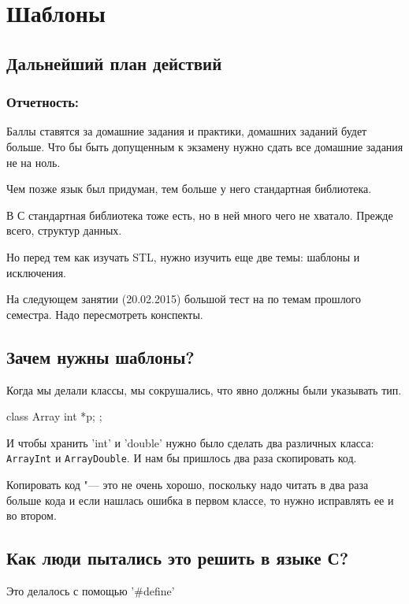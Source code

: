 \chapter{Шаблоны}

\section{Дальнейший план действий}

\subsection{Отчетность:}

Баллы ставятся за домашние задания и практики, домашних заданий будет больше.
Что бы быть допущенным к экзамену нужно сдать все домашние задания не на ноль. 

Чем позже язык был придуман, тем больше у него стандартная библиотека.

В С стандартная библиотека тоже есть, но в ней много чего не хватало.
Прежде всего, структур данных.

Но перед  тем как изучать STL, нужно изучить еще две темы: шаблоны и исключения. 

На следующем занятии (20.02.2015) большой тест на по темам прошлого семестра.
Надо пересмотреть конспекты.

\section{Зачем нужны шаблоны?}
Когда мы делали классы, мы сокрушались, что явно должны были указывать тип.

\begin{cppcode}
class Array{
     int *p;
};
\end{cppcode}

И чтобы хранить \cpp'int' и \cpp'double' нужно было сделать два различных класса: \verb'ArrayInt' и \verb'ArrayDouble'.
И нам бы пришлось два раза скопировать код.

Копировать код "--- это не очень хорошо, поскольку надо читать в два раза больше кода и если нашлась ошибка в первом классе,
то нужно исправлять ее и во втором.

\section{Как люди пытались это решить в языке С?}

Это делалось с помощью \cpp'#define'

